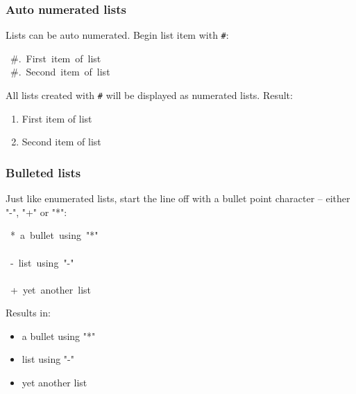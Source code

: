 \documentclass[12pt]{article}
\begin{document}
\subsubsection{Auto numerated lists}

Lists can be auto numerated. Begin list item with \texttt{\#}:

\begin{ttfamily}\begin{flushleft}
\mbox{~\#.~First~item~of~list}\\
\mbox{~\#.~Second~item~of~list}\\
\end{flushleft}\end{ttfamily}

All lists created with \texttt{\#} will be displayed as numerated lists. Result:

\begin{enumerate}[label=\arabic*.]
\item
First item of list

\item
Second item of list
\end{enumerate}
\hypertarget{lbulleted-lists}{}
\subsubsection{Bulleted lists}

Just like enumerated lists, start the line off with a bullet point
character -- either "-", "+" or "*":

\begin{ttfamily}\begin{flushleft}
\mbox{~*~a~bullet~using~"*"}\\
\mbox{}\\
\mbox{~-~list~using~"-"}\\
\mbox{}\\
\mbox{~+~yet~another~list}\\
\end{flushleft}\end{ttfamily}

Results in:

 \begin{itemize}
\item
a bullet using "*"
 \end{itemize}
 \begin{itemize}
\item
list using "-"
 \end{itemize}
 \begin{itemize}
\item
yet another list
\end{itemize}
\end{document}
